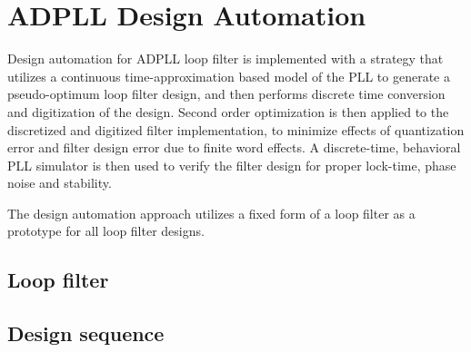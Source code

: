 


\section{ADPLL Design Automation}
Design automation for ADPLL loop filter is implemented with a strategy that utilizes a continuous time-approximation based model of the PLL to generate a pseudo-optimum loop filter design, and then performs discrete time conversion and digitization of the design. Second order optimization is then applied to the discretized and digitized filter implementation, to minimize effects of quantization error and filter design error due to finite word effects. A discrete-time, behavioral PLL simulator is then used to verify the filter design for proper lock-time, phase noise and stability.

The design automation approach utilizes a fixed form of a loop filter as a prototype for all loop filter designs. 

\subsection{Loop filter}
\subsection{Design sequence}

